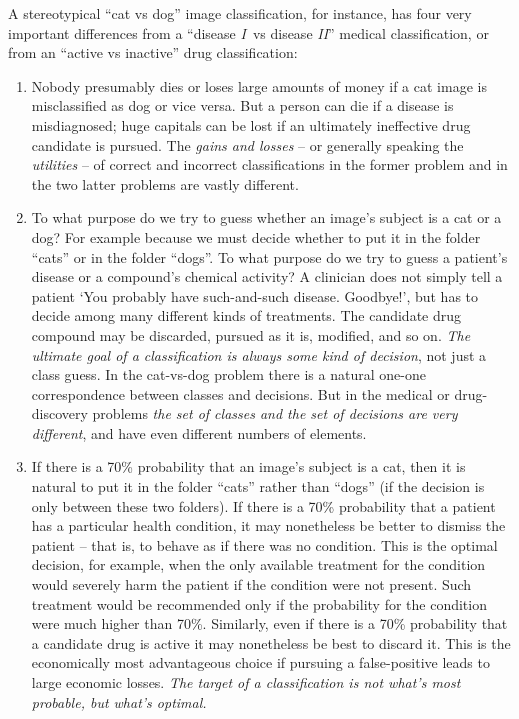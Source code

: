 \documentclass[\ifafour a4paper,12pt,\else a5paper,10pt,\fi%
onecolumn,oneside,article,%
british%
]{memoir}
\theoremstyle{remark}
\theoremstyle{innote}
\newcommand*{\pencil}{{\fontencoding{U}\fontfamily{fontawesometwo}\selectfont\symbol{210}}}
\newcommand{\mynotep}[1]{{\footnotesize\color{notecolour}\pencil\ #1}}
\renewcommand*{\|}[1][]{\nonscript\:#1\vert\nonscript\:\mathopen{}}
\newcommand*{\tI}{\textit{I}}
\newcommand*{\tII}{\textit{II}}
\begin{document}
A stereotypical \enquote{cat vs dog} image classification, for instance, has four very important differences from a \enquote{disease \tI\ vs disease \tII} medical classification, or from an \enquote{active vs inactive} drug classification:
\begin{enumerate}[label=(\roman*),wide]

\item\label{item:gain_loss}Nobody presumably dies or loses large amounts of money if a cat image is misclassified as dog or vice versa. But a person can die if a disease is misdiagnosed; huge capitals can be lost if an ultimately ineffective drug candidate is pursued. The \emph{gains and losses} -- or generally speaking the \emph{utilities} -- of correct and incorrect classifications in the former problem and in the two latter problems are vastly different.

\item\label{item:decisions_classes} To what purpose do we try to guess whether an image's subject is a cat or a dog? For example because we must decide whether to put it in the folder \enquote{cats} or in the folder \enquote{dogs}. To what purpose do we try to guess a patient's disease or a compound's chemical activity? A clinician does not simply tell a patient \enquote*{You probably have such-and-such disease. Goodbye!}, but has to decide among many different kinds of treatments. The candidate drug compound may be discarded, pursued as it is, modified, and so on. \emph{The ultimate goal of a classification is always some kind of decision}, not just a class guess. In the cat-vs-dog problem there is a natural one-one correspondence between classes and decisions. But in the medical or drug-discovery problems \emph{the set of classes and the set of decisions are very different}, and have even different numbers of elements.

\item\label{item:optimal_truth} If there is a 70\% probability that an image's subject is a cat, then it is natural to put it in the folder \enquote{cats} rather than \enquote{dogs} (if the decision is only between these two folders). If there is a 70\% probability that a patient has a particular health condition, it may nonetheless be better to dismiss the patient -- that is, to behave as if there was no condition. This is the optimal decision, for example, when the only available treatment for the condition would severely harm the patient if the condition were not present. Such treatment would be recommended only if the probability for the condition were much higher than 70\%. Similarly, even if there is a 70\% probability that a candidate drug is active it may nonetheless be best to discard it. This is the economically most advantageous choice if pursuing a false-positive leads to large economic losses. \emph{The target of a classification is not what’s most probable, but what’s optimal.}


\end{enumerate}
\end{document}
